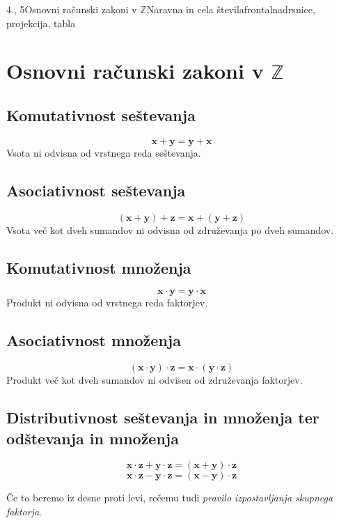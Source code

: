 \begin{priprava}{4., 5}{}{Osnovni računski zakoni v $\mathbb{Z}$}{Naravna in cela števila}{frontalna}{drsnice, projekcija, tabla}


    \section{Osnovni računski zakoni v $\mathbb{Z}$}



    \subsection*{Komutativnost seštevanja}
    $$ \mathbf{x+y=y+x}$$
    Vsota ni odvisna od vrstnega reda seštevanja.
 

    \subsection*{Asociativnost seštevanja}
    $$ \mathbf{(x+y)+z=x+(y+z)}$$
    Vsota več kot dveh sumandov ni odvisna od združevanja po dveh sumandov.
 

    \subsection*{Komutativnost množenja}
    $$ \mathbf{x\cdot y=y\cdot x}$$
    Produkt ni odvisna od vrstnega reda faktorjev.
 

    \subsection*{Asociativnost množenja}
    $$ \mathbf{(x\cdot y)\cdot z=x\cdot (y\cdot z)}$$
    Produkt več kot dveh sumandov ni odvisen od združevanja faktorjev.
 
    \subsection*{Distributivnost seštevanja in množenja ter odštevanja in množenja}
    $$ \mathbf{x\cdot z+y\cdot z = (x+y)\cdot z} $$
    $$ \mathbf{x\cdot z-y\cdot z = (x-y)\cdot z} $$

    Če to beremo iz desne proti levi, rečemu tudi \textit{pravilo izpostavljanja skupnega faktorja}.

    ~\\

    \begin{multicols}{2}
        


\end{multicols}
\end{priprava}

